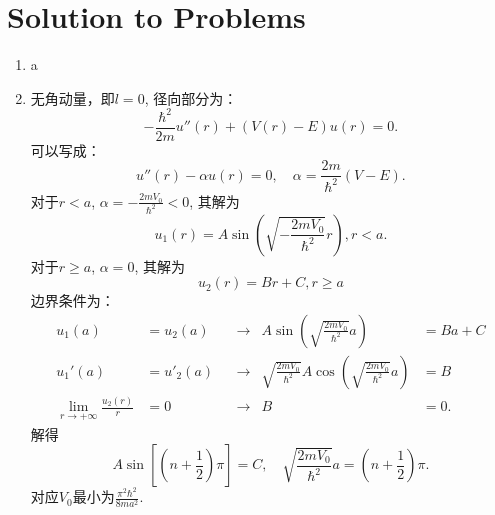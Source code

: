 \newpage
\section*{Solution to Problems}
\begin{enumerate}
    \item a
    \item 无角动量，即$l=0$, 径向部分为：
        \begin{equation}
                -\frac{\hbar^2}{2m}u''(r)+(V(r)-E)u(r)=0.
        \end{equation}
        可以写成：
        \begin{equation}
            u''(r)-\alpha u(r)=0,\quad \alpha = \frac{2m}{\hbar^2}(V-E).
        \end{equation}
        对于$r<a$, $\alpha=-\frac{2mV_0}{\hbar^2}<0$, 其解为 
        \begin{equation}
            u_1(r)=A\sin\left(\sqrt{-\frac{2mV_0}{\hbar^2}}r\right),r<a.
        \end{equation}
        对于$r\ge a$, $\alpha=0$, 其解为 
        \begin{equation}
            u_2(r)=Br+C, r\ge a
        \end{equation}
        边界条件为：
        \begin{align}
            u_1(a)&=u_2(a) &&\to &A\sin\left(\sqrt{\frac{2mV_0}{\hbar^2}}a\right)&=Ba+C\\
            u_1'(a)&=u'_2(a) &&\to &\sqrt{\frac{2mV_0}{\hbar^2}}A\cos\left(\sqrt{\frac{2mV_0}{\hbar^2}}a\right)&=B\\
            \lim_{r\to+\infty}\frac{u_2(r)}{r}&=0 &&\to &B&=0.
        \end{align}
        解得\begin{equation}
            A\sin[(n+\frac{1}{2})\pi]=C, \quad\sqrt{\frac{2mV_0}{\hbar^2}}a=(n+\frac{1}{2})\pi.
        \end{equation}
        对应$V_0$最小为$\frac{\pi^2\hbar^2}{8ma^2}$.
\end{enumerate}


